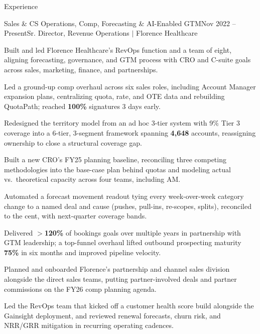 \documentclass{resume}
\begin{document}
\begin{rSection}{Experience}

\begin{rSubsection}{Sales \& CS Operations, Comp, Forecasting \& AI-Enabled GTM}{\textcolor{black!60}{Nov 2022 -- Present}}{Sr. Director, Revenue Operations $\vert$ Florence Healthcare}{}
\item Built and led Florence Healthcare's RevOps function and a team of eight, aligning forecasting, governance, and GTM process with CRO and C-suite goals across sales, marketing, finance, and partnerships.
\item Led a ground-up comp overhaul across six sales roles, including Account Manager expansion plans, centralizing quota, rate, and OTE data and rebuilding QuotaPath; reached \textbf{100\%} signatures 3 days early.
\item Redesigned the territory model from an ad hoc 3-tier system with 9\% Tier 3 coverage into a 6-tier, 3-segment framework spanning \textbf{4,648} accounts, reassigning ownership to close a structural coverage gap.
\item Built a new CRO's FY25 planning baseline, reconciling three competing methodologies into the base-case plan behind quotas and modeling actual vs.\ theoretical capacity across four teams, including AM.
\item Automated a forecast movement readout tying every week-over-week category change to a named deal and cause (pushes, pull-ins, re-scopes, splits), reconciled to the cent, with next-quarter coverage bands.
\item Delivered $>$\textbf{120\%} of bookings goals over multiple years in partnership with GTM leadership; a top-funnel overhaul lifted outbound prospecting maturity \textbf{75\%} in six months and improved pipeline velocity.
\item Planned and onboarded Florence's partnership and channel sales division alongside the direct sales teams, putting partner-involved deals and partner commissions on the FY26 comp planning agenda.
\item Led the RevOps team that kicked off a customer health score build alongside the Gainsight deployment, and reviewed renewal forecasts, churn risk, and NRR/GRR mitigation in recurring operating cadences.

\end{rSubsection}
\end{rSection}
\end{document}
